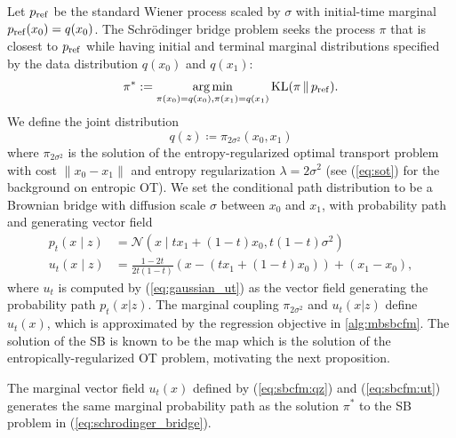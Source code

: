 \documentclass[10pt]{article}
\theoremstyle{plain}
\theoremstyle{definition}
\theoremstyle{remark}
\begin{document}
Let $p_{\rm ref}$ be the standard Wiener process scaled by $\sigma$ with initial-time marginal $p_{\rm ref}(x_0)=q(x_0)$. The Schr\"odinger bridge problem \citep{schrodinger} seeks the process $\pi$ that is closest to $p_{\rm ref}$ while having initial and terminal marginal distributions specified by the data distribution $q(x_0)$ and $q(x_1)$:
\begin{equation}\label{eq:schrodinger_bridge}
\pi^*:=\operatorname*{arg\,min}_{\pi(x_0)=q(x_0),\pi(x_1)=q(x_1) }{\rm KL}(\pi\,\|\,p_{\rm ref}).
\end{equation}
We define the joint distribution
\begin{equation}\label{eq:sbcfm:qz}
q(z) \coloneqq \pi_{2\sigma^2}(x_0, x_1)
\end{equation}
where $\pi_{2\sigma^2}$ is the solution of the entropy-regularized optimal transport problem \citep{cuturi_sinkhorn_2013} with cost $\|x_0-x_1\|$ and entropy regularization $\lambda=2 \sigma^2$ (see (\ref{eq:sot}) for the background on entropic OT). We set the conditional path distribution to be a Brownian bridge with diffusion scale $\sigma$ between $x_0$ and $x_1$, with probability path and generating vector field
\begin{align}
p_t(x \mid z) &= \mathcal{N}( x \mid t x_1 + (1 - t) x_0, t(1-t)\sigma^2) \label{eq:sbcfm:pt} \\
u_t(x \mid z) &= \frac{1-2t}{2t(1-t)}(x - ( t x_1 + (1-t)x_0) ) + (x_1 - x_0) \label{eq:sbcfm:ut},
\end{align}
where $u_t$ is computed by (\ref{eq:gaussian_ut}) as the vector field generating the probability path $p_t(x|z)$. The marginal coupling $\pi_{2\sigma^2}$ and $u_t(x|z)$ define $u_t(x)$, which is approximated by the regression objective in \autoref{alg:mbsbcfm}. The solution of the SB is known to be the map which is the solution of the entropically-regularized OT problem, motivating the next proposition.
\begin{propositionE}\label{lem:sbcfm}
The marginal vector field $u_t(x)$ defined by (\ref{eq:sbcfm:qz}) and (\ref{eq:sbcfm:ut}) generates the same marginal probability path as the solution $\pi^*$ to the SB problem in (\ref{eq:schrodinger_bridge}).
\end{propositionE}
\end{document}
